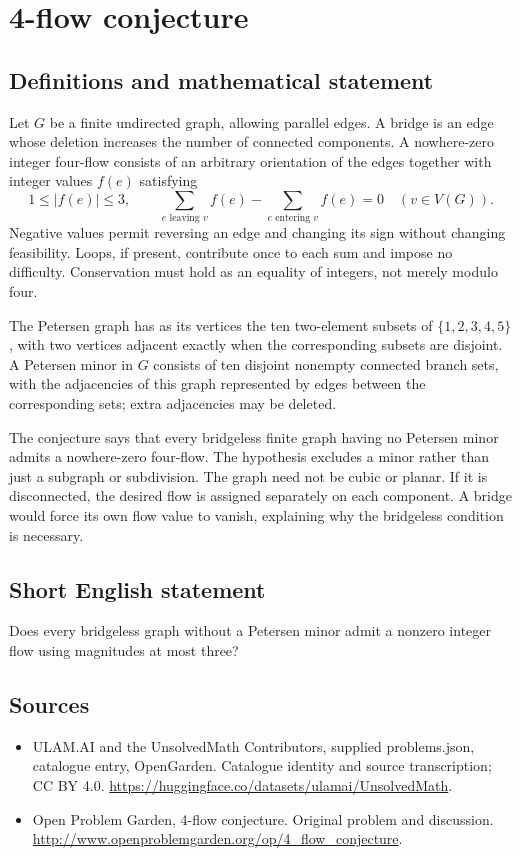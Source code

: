 \documentclass[11pt,a4paper]{article}
\begin{document}
\section*{4-flow conjecture}\label{statement}

\subsection{Definitions and mathematical statement}
Let $G$ be a finite undirected graph, allowing parallel edges. A bridge is an edge whose deletion increases the number of connected components. A nowhere-zero integer four-flow consists of an arbitrary orientation of the edges together with integer values $f(e)$ satisfying
\[
 1\le |f(e)|\le3,
 \qquad \sum_{e\text{ leaving }v}f(e)
       -\sum_{e\text{ entering }v}f(e)=0
       \quad(v\in V(G)).
\]
Negative values permit reversing an edge and changing its sign without changing feasibility. Loops, if present, contribute once to each sum and impose no difficulty. Conservation must hold as an equality of integers, not merely modulo four.

The Petersen graph has as its vertices the ten two-element subsets of $\{1,2,3,4,5\}$, with two vertices adjacent exactly when the corresponding subsets are disjoint. A Petersen minor in $G$ consists of ten disjoint nonempty connected branch sets, with the adjacencies of this graph represented by edges between the corresponding sets; extra adjacencies may be deleted.

The conjecture says that every bridgeless finite graph having no Petersen minor admits a nowhere-zero four-flow. The hypothesis excludes a minor rather than just a subgraph or subdivision. The graph need not be cubic or planar. If it is disconnected, the desired flow is assigned separately on each component. A bridge would force its own flow value to vanish, explaining why the bridgeless condition is necessary.
\subsection{Short English statement}
Does every bridgeless graph without a Petersen minor admit a nonzero integer flow using magnitudes at most three?
\subsection{Sources}
\begin{itemize}
\item[S1] ULAM.AI and the UnsolvedMath Contributors, supplied problems.json, catalogue entry, OpenGarden. Catalogue identity and source transcription; CC BY 4.0.
\url{https://huggingface.co/datasets/ulamai/UnsolvedMath}.
\item[S2] Open Problem Garden, 4-flow conjecture. Original problem and discussion.
\url{http://www.openproblemgarden.org/op/4_flow_conjecture}.
\end{itemize}
\end{document}
